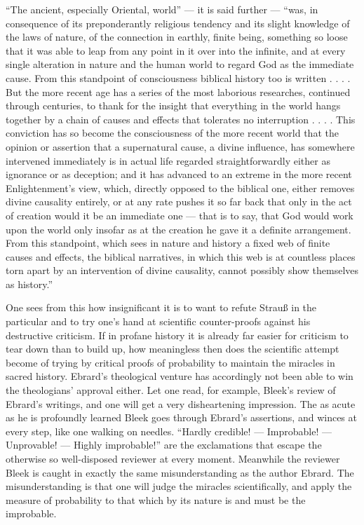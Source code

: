 \documentclass[12pt,a4paper]{book}
\begin{document}
``The ancient, especially Oriental, world'' --- it is said further --- ``was, in
consequence of its preponderantly religious tendency and its slight knowledge of the laws
of nature, of the connection in earthly, finite being, something so loose that it was able
to leap from any point in it over into the infinite, and at every single alteration in
nature and the human world to regard God as the immediate cause. From this standpoint of
consciousness biblical history too is written . . . . But the more recent age has a series
of the most laborious researches, continued through centuries, to thank for the insight
that everything in the world hangs together by a chain of causes and effects that tolerates
no interruption . . . . This conviction has so become the consciousness of the more recent
world that the opinion or assertion that a supernatural cause, a divine influence, has
somewhere intervened immediately is in actual life regarded straightforwardly either as
ignorance or as deception; and it has advanced to an extreme in the more recent
Enlightenment's view, which, directly opposed to the biblical one, either removes divine
causality entirely, or at any rate pushes it so far back that only in the act of creation
would it be an immediate one --- that is to say, that God would work upon the world only
insofar as at the creation he gave it a definite arrangement. From this standpoint, which
sees in nature and history a fixed web of finite causes
and effects, the biblical narratives, in which this web is at countless places torn apart
by an intervention of divine causality, cannot possibly show themselves as history.''

One sees from this how insignificant it is to want to refute Strauß in the particular and
to try one's hand at scientific counter-proofs against his destructive criticism. If in
profane history it is already far easier for criticism to tear down than to build up, how
meaningless then does the scientific attempt become of trying by critical proofs of
probability to maintain the miracles in sacred history. Ebrard's theological venture has
accordingly not been able to win the theologians' approval either. Let one read, for
example, Bleek's review of Ebrard's writings, and one will get a very disheartening
impression. The as acute as he is profoundly learned Bleek goes through Ebrard's
assertions, and winces at every step, like one walking on needles. ``Hardly credible! ---
Improbable! --- Unprovable! --- Highly improbable!'' are the exclamations that escape the
otherwise so well-disposed reviewer at every moment. Meanwhile the reviewer Bleek is
caught in exactly the same misunderstanding as the author Ebrard. The misunderstanding is
that one will judge the miracles scientifically, and apply the measure of probability to
that which by its nature is and must be the improbable.
\end{document}
